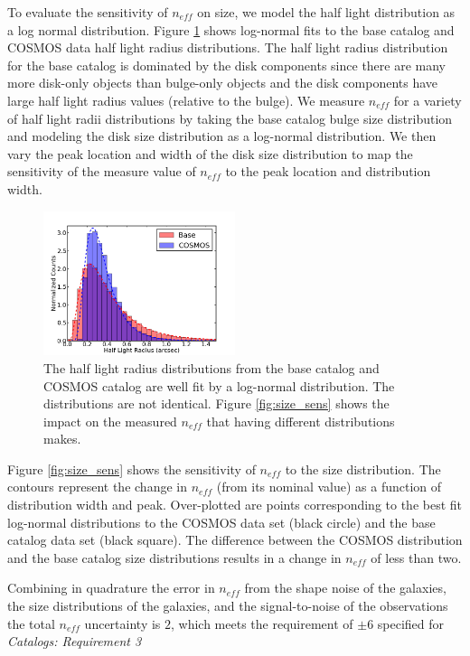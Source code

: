 \documentclass[11pt]{article}
\begin{document}
To evaluate the sensitivity of $n_{eff}$ on size, we model the 
half light distribution as a log normal distribution.  Figure
\ref{fig:ln_fit} shows log-normal fits to the base catalog and COSMOS
data half light radius distributions.  The half light radius
distribution for the base catalog is dominated by the disk components
since there are many more disk-only objects than bulge-only objects
and the disk components have large half light radius values (relative
to the bulge). We measure $n_{eff}$ for a variety of half light radii
distributions by taking the base catalog bulge size distribution and
modeling the disk size distribution as a log-normal distribution.  We
then vary the peak location and width of the disk size distribution
to map the sensitivity of the measure value of $n_{eff}$ to the peak
location and distribution width.
\begin{figure}[h]
\centering
\includegraphics[width=0.5\textwidth]{validation_figures/ln_fit.png}
\caption{The half light radius distributions from the base catalog and 
COSMOS catalog are well fit by a log-normal distribution.  The distributions
are not identical.  Figure \ref{fig:size_sens} shows the impact on the  
measured $n_{eff}$ that having different distributions makes.
    \label{fig:ln_fit}}
\end{figure}

Figure \ref{fig:size_sens} shows the sensitivity of $n_{eff}$ to the
size distribution.  The contours represent the change in $n_{eff}$
(from its nominal value) as a function of distribution width and
peak. Over-plotted are points corresponding to the best fit log-normal
distributions to the COSMOS data set (black circle) and the base
catalog data set (black square).  The difference between the COSMOS
distribution and the base catalog size distributions results in a
change in $n_{eff}$ of less than two.

Combining in quadrature the error in $n_{eff}$ from the shape noise of
the galaxies, the size distributions of the galaxies, and the
signal-to-noise of the observations the total $n_{eff}$ uncertainty is
$2$, which meets the requirement of $\pm6$ specified for {\it
  Catalogs: Requirement 3}
\end{document}
